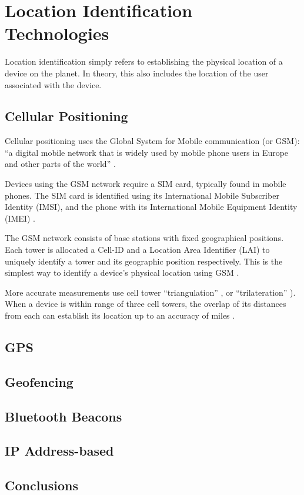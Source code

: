 \section{Location Identification Technologies}

Location identification simply refers to establishing the
physical location of a device on the planet.
In theory, this also includes the location of the user
associated with the device.

\subsection{Cellular Positioning}

Cellular positioning uses the Global System for Mobile
communication (or GSM): \enquote{a digital mobile network
  that is widely used by mobile phone users in Europe and
  other parts of the world} \parencite{whatIsGSM}.

Devices using the GSM network require a SIM card, typically
found in mobile phones.
The SIM card is identified using its International Mobile
Subscriber Identity (IMSI), and the phone with its
International Mobile Equipment Identity (IMEI)
\parencite{trackingSuspectByPhone}.

The GSM network consists of base stations with fixed
geographical positions.
Each tower is allocated a Cell-ID and a Location Area
Identifier (LAI) to uniquely identify a tower and its
geographic position respectively.
This is the simplest way to identify a device's physical
location using GSM \parencite{suveryOfCellPos}.

More accurate measurements use cell tower
\enquote{triangulation} \parencite{howCellTowerTriWorks},
or \enquote{trilateration} \parencite{suveryOfCellPos}).
When a device is within range of three cell towers, the
overlap of its distances from each can establish its
location up to an accuracy of  miles
\parencite{howCellTowerTriWorks}.

\subsection{GPS}

\subsection{Geofencing}

\subsection{Bluetooth Beacons}

\subsection{IP Address-based}

\subsection{Conclusions}

